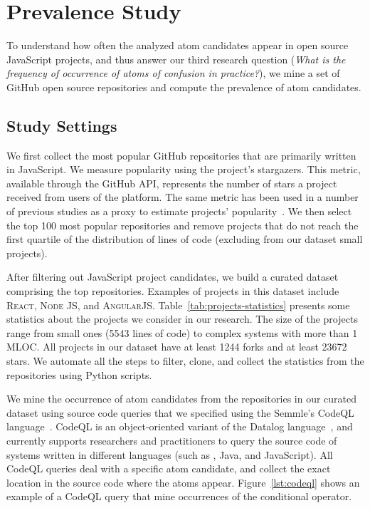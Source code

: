 \section{Prevalence Study}\label{sec:s04}

To understand how often the analyzed atom candidates appear in open source JavaScript projects, and thus answer our third research question (\emph{What is the frequency of occurrence of atoms of confusion in practice?}), we mine a set of GitHub open source repositories and compute the prevalence of atom candidates.

\subsection{Study Settings}

We first collect the most popular GitHub repositories that are primarily written in JavaScript. We measure popularity using the project's stargazers. This metric, available through the GitHub API, represents the number of stars a project received from users of the platform. The same metric has been used in a number of previous studies as a proxy to estimate projects' popularity~\cite{gyimesi2019bugsjs,canedo:esem2020}. We then select the top 100 most popular repositories and remove projects that do not reach the first quartile of the distribution of lines of code (excluding from our dataset small projects). 

After filtering out JavaScript project candidates, we build a curated dataset comprising the top \minedprojects repositories. Examples of projects in this dataset include \textsc{React}, \textsc{Node JS}, and \textsc{AngularJS}. Table~\ref{tab:projects-statistics} presents some statistics about the projects we consider in our research. The size of the projects range from small ones (5543 lines of code) to complex systems with more than 1 MLOC. All projects in our dataset have at least \num{1244} forks and at least \num{23672} stars. We automate all the steps to filter, clone, and collect the statistics from the repositories using Python scripts.

We mine the occurrence of atom candidates from the repositories in our curated dataset using source code queries that we specified using the Semmle's CodeQL language~\cite{moor:gttse2007}. CodeQL is an object-oriented variant of the Datalog language~\cite{rodriguez2020efficient}, and currently supports researchers and practitioners to query the source code of systems written in different languages (such as \cpplang, Java, and JavaScript). All CodeQL queries deal with a specific atom candidate, and collect the exact location in the source code where the atoms appear. Figure~\ref{lst:codeql} shows an example of a CodeQL query that mine occurrences of the conditional operator.

